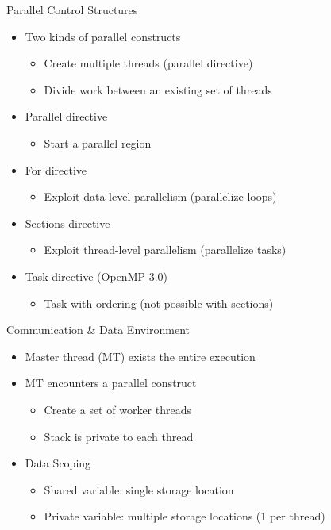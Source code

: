 \begin{frame}{Parallel Control Structures}
  \begin{itemize}
  \item Two kinds of parallel constructs
    \begin{itemize}
    \item Create multiple threads (parallel directive)
    \item Divide work between an existing set of threads
    \end{itemize}
  \item Parallel directive
    \begin{itemize}
    \item Start a parallel region
    \end{itemize}
  \item For directive
    \begin{itemize}
    \item Exploit data-level parallelism (parallelize loops)
    \end{itemize}
  \item Sections directive
    \begin{itemize}
    \item Exploit thread-level parallelism (parallelize tasks)
    \end{itemize}
  \item Task directive (OpenMP 3.0)
    \begin{itemize}
    \item Task with ordering (not possible with sections)
    \end{itemize}
  \end{itemize}
\end{frame}

\begin{frame}{Communication \& Data Environment}
  \begin{itemize}
  \item Master thread (MT) exists the entire execution
  \item MT encounters a parallel construct
    \begin{itemize}
    \item Create a set of worker threads
    \item Stack is private to each thread
    \end{itemize}
  \item Data Scoping
    \begin{itemize}
    \item Shared variable: single storage location
    \item Private variable: multiple storage locations (1 per thread)
    \end{itemize}
  \end{itemize}
\end{frame}

